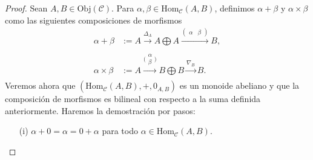 \documentclass[tesis]{subfiles}
\begin{document}
\begin{proof}

    Sean $A,B\in\text{Obj}(\mathscr{C})$. Para $\alpha,\beta\in\text{Hom}_\mathscr{C}(A,B)$, definimos $\alpha+\beta$ y $\alpha\times\beta$ como las siguientes composiciones de morfismos 
    \begin{align*}
        \alpha+\beta &:= A\xrightarrow[]{\Delta_A}A\bigoplus A\xrightarrow[]{(\begin{smallmatrix} \alpha &\beta \end{smallmatrix})} B, \\
        \alpha\times\beta &:= A\xrightarrow[]{\big(\begin{smallmatrix} \alpha \\ \beta \end{smallmatrix}\big)}B\bigoplus B\xrightarrow[]{\nabla_B} B.
    \end{align*}
    Veremos ahora que $(\text{Hom}_\mathscr{C}(A,B),+,0_{A,B})$ es un monoide abeliano y que la composición de morfismos es bilineal con respecto a la suma definida anteriormente. Haremos la demostración por pasos:

    \begin{itemize}
    
        \item[(i)] $\alpha+0=\alpha=0+\alpha$ para todo $\alpha\in\text{Hom}_\mathscr{C}(A,B)$.


\end{itemize}
\end{proof}
\end{document}
